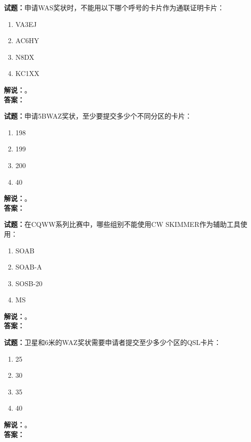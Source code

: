 \documentclass{ctexbook}
\begin{document}
\vspace{\baselineskip}

\noindent\textbf{试题：}申请WAS奖状时，不能用以下哪个呼号的卡片作为通联证明卡片：
\begin{enumerate}[leftmargin=3em]
  \item VA3EJ
  \item AC6HY
  \item N8DX
  \item KC1XX
\end{enumerate}
\noindent\textbf{解说：}\textbf{}。\\\noindent\textbf{答案：}

\vspace{\baselineskip}

\noindent\textbf{试题：}申请5BWAZ奖状，至少要提交多少个不同分区的卡片：
\begin{enumerate}[leftmargin=3em]
  \item 198
  \item 199
  \item 200
  \item 40
\end{enumerate}
\noindent\textbf{解说：}\textbf{}。\\\noindent\textbf{答案：}

\vspace{\baselineskip}

\noindent\textbf{试题：}在CQWW系列比赛中，哪些组别不能使用CW SKIMMER作为辅助工具使用：
\begin{enumerate}[leftmargin=3em]
  \item SOAB
  \item SOAB-A
  \item SOSB-20
  \item MS
\end{enumerate}
\noindent\textbf{解说：}\textbf{}。\\\noindent\textbf{答案：}

\vspace{\baselineskip}

\noindent\textbf{试题：}卫星和6米的WAZ奖状需要申请者提交至少多少个区的QSL卡片：
\begin{enumerate}[leftmargin=3em]
  \item 25
  \item 30
  \item 35
  \item 40
\end{enumerate}
\noindent\textbf{解说：}\textbf{}。\\\noindent\textbf{答案：}
\end{document}
